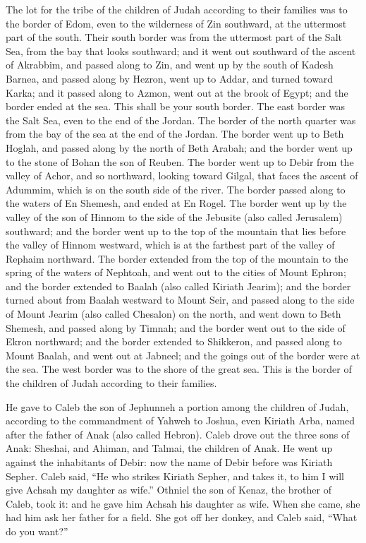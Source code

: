  The lot for the tribe of the children of Judah according to
their families was to the border of Edom, even to the wilderness of Zin
southward, at the uttermost part of the south.  Their south
border was from the uttermost part of the Salt Sea, from the bay that
looks southward;  and it went out southward of the ascent of
Akrabbim, and passed along to Zin, and went up by the south of Kadesh
Barnea, and passed along by Hezron, went up to Addar, and turned toward
Karka;  and it passed along to Azmon, went out at the brook
of Egypt; and the border ended at the sea. This shall be your south
border.  The east border was the Salt Sea, even to the end
of the Jordan. The border of the north quarter was from the bay of the
sea at the end of the Jordan.  The border went up to Beth
Hoglah, and passed along by the north of Beth Arabah; and the border
went up to the stone of Bohan the son of Reuben.  The border
went up to Debir from the valley of Achor, and so northward, looking
toward Gilgal, that faces the ascent of Adummim, which is on the south
side of the river. The border passed along to the waters of En Shemesh,
and ended at En Rogel.  The border went up by the valley of
the son of Hinnom to the side of the Jebusite (also called Jerusalem)
southward; and the border went up to the top of the mountain that lies
before the valley of Hinnom westward, which is at the farthest part of
the valley of Rephaim northward.  The border extended from
the top of the mountain to the spring of the waters of Nephtoah, and
went out to the cities of Mount Ephron; and the border extended to
Baalah (also called Kiriath Jearim);  and the border turned
about from Baalah westward to Mount Seir, and passed along to the side
of Mount Jearim (also called Chesalon) on the north, and went down to
Beth Shemesh, and passed along by Timnah;  and the border
went out to the side of Ekron northward; and the border extended to
Shikkeron, and passed along to Mount Baalah, and went out at Jabneel;
and the goings out of the border were at the sea.  The west
border was to the shore of the great sea. This is the border of the
children of Judah according to their families.

 He gave to Caleb the son of Jephunneh a portion among the
children of Judah, according to the commandment of Yahweh to Joshua,
even Kiriath Arba, named after the father of Anak (also called Hebron).
 Caleb drove out the three sons of Anak: Sheshai, and
Ahiman, and Talmai, the children of Anak.  He went up
against the inhabitants of Debir: now the name of Debir before was
Kiriath Sepher.  Caleb said, ``He who strikes Kiriath
Sepher, and takes it, to him I will give Achsah my daughter as wife.''
 Othniel the son of Kenaz, the brother of Caleb, took it:
and he gave him Achsah his daughter as wife.  When she
came, she had him ask her father for a field. She got off her donkey,
and Caleb said, ``What do you want?''

